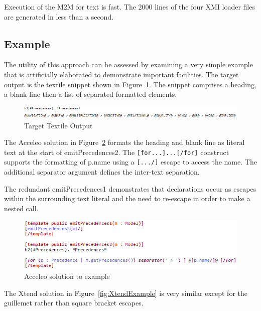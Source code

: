 \documentclass{llncs}
\begin{document}
Execution of the M2M for text is fast. The 2000 lines of the four XMI loader files are generated in less than a second.

\subsection{Example}\label{Example}

The utility of this approach can be assessed by examining a very simple example that is artificially elaborated to demonstrate important facilities. The target output is the textile snippet shown in Figure~\ref{fig:TextileExample}. The snippet comprises a heading, a blank line then a list of separated formatted elements. 

\begin{figure}
	\begin{center}
		\includegraphics[width=4.9in]{TextileExample.png}
	\end{center}
	\caption{Target Textile Output}
	\label{fig:TextileExample}
\end{figure}

The Acceleo solution in Figure~\ref{fig:AcceleoExample} formats the heading and blank line as literal text at the start of emitPrecedences2. The \verb|[for...]...[/for]| construct supports the formatting of p.name using a \verb|[.../]| escape to access the name. The additional separator argument defines the inter-text separation.

The redundant emitPrecedences1 demonstrates that declarations occur as escapes within the surrounding text literal and the need to re-escape in order to make a nested call. 

\begin{figure}
	\begin{center}
		\includegraphics[width=4.9in]{AcceleoExample.png}
	\end{center}
	\caption{Acceleo solution to example}
	\label{fig:AcceleoExample}
\end{figure}

The Xtend solution in Figure~\ref{fig:XtendExample} is very similar except for the guillemet rather than square bracket escapes.
\end{document}

